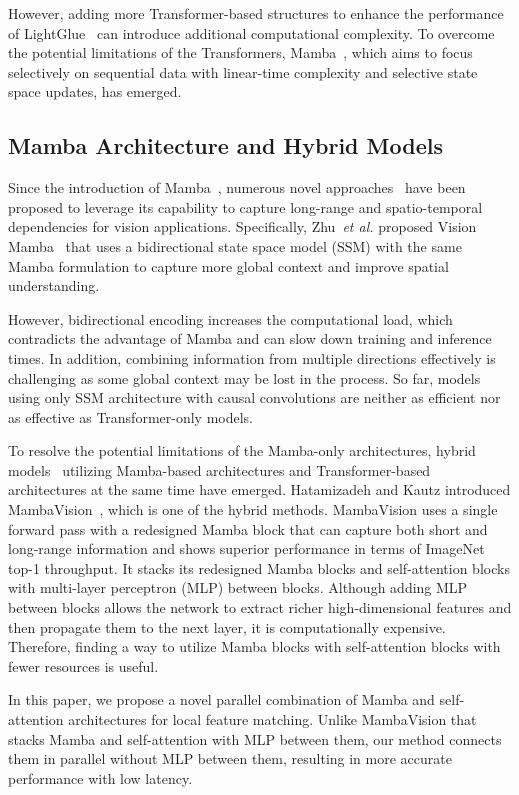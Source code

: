 However, adding more Transformer-based structures to enhance the performance of LightGlue~\cite{lindenberger2023lightglue} can introduce additional computational complexity. To overcome the potential limitations of the Transformers, Mamba~\cite{gu2023mamba}, which aims to focus selectively on sequential data with linear-time complexity and selective state space updates, has emerged.

\subsection{Mamba Architecture and Hybrid Models}

Since the introduction of Mamba~\cite{gu2023mamba}, numerous novel approaches~\cite{shi2024multi,yang2024vivim} have been proposed to leverage its capability to capture long-range and spatio-temporal dependencies for vision applications. Specifically, Zhu~\textit{et al.} proposed Vision Mamba~\cite{zhu2024vision} that uses a bidirectional state space model (SSM) with the same Mamba formulation to capture more global context and improve spatial understanding. 

However, bidirectional encoding increases the computational load, which contradicts the advantage of Mamba and can slow down training and inference times. In addition, combining information from multiple directions effectively is challenging as some global context may be lost in the process. So far, models using only SSM architecture with causal convolutions are neither as efficient nor as effective as Transformer-only models. 

To resolve the potential limitations of the Mamba-only architectures, hybrid models~\cite{lieber2024jamba} utilizing Mamba-based architectures and Transformer-based architectures at the same time have emerged. Hatamizadeh and Kautz introduced MambaVision~\cite{hatamizadeh2024mambavision}, which is one of the hybrid methods. MambaVision uses a single forward pass with a redesigned Mamba block that can capture both short and long-range information and shows superior performance in terms of ImageNet top-1 throughput. It stacks its redesigned Mamba blocks and self-attention blocks with multi-layer perceptron (MLP) between blocks. Although adding MLP between blocks allows the network to extract richer high-dimensional features and then propagate them to the next layer, it is computationally expensive. Therefore, finding a way to utilize Mamba blocks with self-attention blocks with fewer resources is useful.

In this paper, we propose a novel parallel combination of Mamba and self-attention architectures for local feature matching. Unlike MambaVision that stacks Mamba and self-attention with MLP between them, our method connects them in parallel without MLP between them, resulting in more accurate performance with low latency.


